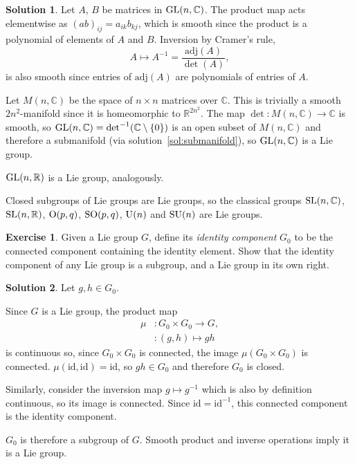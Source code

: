 \documentclass[11pt, a4paper]{report}
\theoremstyle{definition}
\newtheorem{ex}{Exercise}[part]
\newtheorem{sol}{Solution}[part]
\newcommand*{\GL}{\ensuremath\text{GL}}
\newcommand*{\SL}{\ensuremath\text{SL}}
\renewcommand*{\O}{\ensuremath\text{O}}
\newcommand*{\SO}{\ensuremath\text{SO}}
\newcommand*{\U}{\ensuremath\text{U}}
\newcommand*{\SU}{\ensuremath\text{SU}}
\begin{document}
\begin{sol}

Let $A$, $B$ be matrices in $\GL(n, \mathbb{C})$. The product map acts elementwise as ${(ab)}_{ij} = a_{ik} b_{kj}$,
which is smooth since the product is a polynomial of elements of $A$ and $B$.
Inversion by Cramer's rule,
\[
    A \mapsto A^{-1} = \frac{\text{adj}(A)}{\det(A)},
\]
is also smooth since entries of $\text{adj}(A)$ are polynomials of entries of $A$.

Let $M(n, \mathbb{C})$ be the space of $n \times n$ matrices over $\mathbb{C}$.
This is trivially a smooth $2n^2$-manifold since it is homeomorphic to $\mathbb{R}^{2n^2}$.
The map $\det : M(n, \mathbb{C}) \to \mathbb{C}$ is smooth, so $\GL(n, \mathbb{C}) = \det^{-1}(\mathbb{C} \setminus \{0\})$ is an open subset of $M(n, \mathbb{C})$ and therefore a submanifold (via solution~\ref{sol:submanifold}), so $\GL(n, \mathbb{C})$ is a Lie group.

$\GL(n, \mathbb{R})$ is a Lie group, analogously.

Closed subgroups of Lie groups are Lie groups, so the classical groups $\SL(n, \mathbb{C})$, $\SL(n, \mathbb{R})$, $\O(p, q)$, $\SO(p, q)$, $\U(n)$ and $\SU(n)$ are Lie groups.

\end{sol}

\begin{ex}

Given a Lie group $G$, define its \emph{identity component} $G_0$ to be the connected component containing the identity element.
Show that the identity component of any Lie group is a subgroup, and a Lie group in its own right.

\end{ex}

\begin{sol}

Let $g, h \in G_0$.

Since $G$ is a Lie group, the product map
\begin{align*}
    \mu &: G_0 \times G_0 \to G, \\
        &: (g, h) \mapsto gh
\end{align*}
is continuous so, since $G_0 \times G_0$ is connected, the image $\mu(G_0 \times G_0)$ is connected. $\mu(\text{id}, \text{id}) = \text{id}$, so $gh \in G_0$ and therefore $G_0$ is closed.

Similarly, consider the inversion map $g \mapsto g^{-1}$ which is also by definition continuous, so its image is connected. Since $\text{id} = \text{id}^{-1}$, this connected component is the identity component.

$G_0$ is therefore a subgroup of $G$. Smooth product and inverse operations imply it is a Lie group.

\end{sol}
\end{document}
